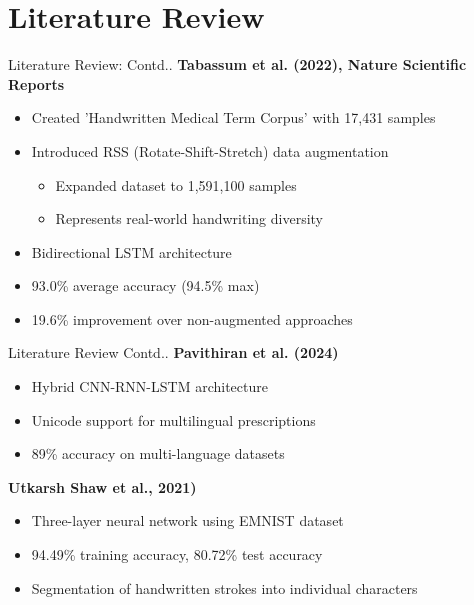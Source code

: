 \documentclass{beamer}
\begin{document}
\section{Literature Review}

\begin{frame}{Literature Review: Contd..}
\textbf{Tabassum et al. (2022), Nature Scientific Reports~\cite{tabassum2021recognition}}
\begin{itemize}
    \item Created 'Handwritten Medical Term Corpus' with 17,431 samples
    \item Introduced RSS (Rotate-Shift-Stretch) data augmentation
    \begin{itemize}
        \item Expanded dataset to 1,591,100 samples
        \item Represents real-world handwriting diversity
    \end{itemize}
    \item Bidirectional LSTM architecture
    \item 93.0\% average accuracy (94.5\% max)
    \item 19.6\% improvement over non-augmented approaches
\end{itemize}
\end{frame}

\begin{frame}{Literature Review Contd..}
\textbf{Pavithiran et al. (2024)~\cite{pavithiran2024multilingual}}
\begin{itemize}
    \item Hybrid CNN-RNN-LSTM architecture
    \item Unicode support for multilingual prescriptions
    \item 89\% accuracy on multi-language datasets
\end{itemize}


\textbf{Utkarsh Shaw et al., 2021)~\cite{utkarshaw2021}}
  \begin{itemize}
  \item Three-layer neural network using EMNIST dataset
  \item 94.49\% training accuracy, 80.72\% test accuracy
  \item Segmentation of handwritten strokes into individual characters
  \end{itemize}
\end{frame}
\end{document}
